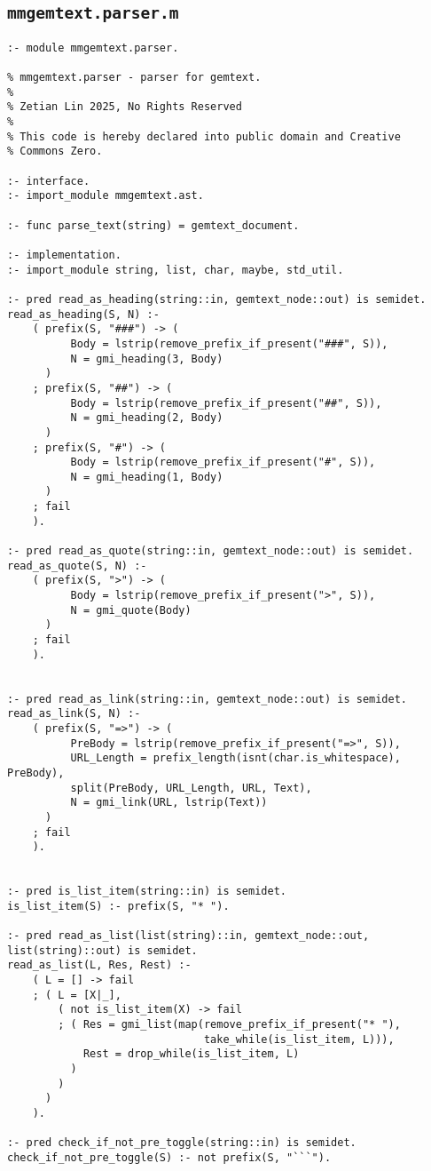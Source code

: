\subsection{\texttt{mmgemtext.parser.m}}

\begin{lstlisting}[language=Mercury]
:- module mmgemtext.parser.

% mmgemtext.parser - parser for gemtext.
%
% Zetian Lin 2025, No Rights Reserved
%
% This code is hereby declared into public domain and Creative
% Commons Zero.

:- interface.
:- import_module mmgemtext.ast.

:- func parse_text(string) = gemtext_document.

:- implementation.
:- import_module string, list, char, maybe, std_util.

:- pred read_as_heading(string::in, gemtext_node::out) is semidet.
read_as_heading(S, N) :-
	( prefix(S, "###") -> (
		  Body = lstrip(remove_prefix_if_present("###", S)),
		  N = gmi_heading(3, Body)
	  )
	; prefix(S, "##") -> (
		  Body = lstrip(remove_prefix_if_present("##", S)),
		  N = gmi_heading(2, Body)
	  )
	; prefix(S, "#") -> (
		  Body = lstrip(remove_prefix_if_present("#", S)),
		  N = gmi_heading(1, Body)
	  )
	; fail
	).

:- pred read_as_quote(string::in, gemtext_node::out) is semidet.
read_as_quote(S, N) :-
	( prefix(S, ">") -> (
		  Body = lstrip(remove_prefix_if_present(">", S)),
		  N = gmi_quote(Body)
	  )
	; fail
	).


:- pred read_as_link(string::in, gemtext_node::out) is semidet.
read_as_link(S, N) :-
	( prefix(S, "=>") -> (
		  PreBody = lstrip(remove_prefix_if_present("=>", S)),
		  URL_Length = prefix_length(isnt(char.is_whitespace), PreBody),
		  split(PreBody, URL_Length, URL, Text),
		  N = gmi_link(URL, lstrip(Text))
	  )
	; fail
	).


:- pred is_list_item(string::in) is semidet.
is_list_item(S) :- prefix(S, "* ").

:- pred read_as_list(list(string)::in, gemtext_node::out, list(string)::out) is semidet.
read_as_list(L, Res, Rest) :-
	( L = [] -> fail
	; ( L = [X|_],
		( not is_list_item(X) -> fail
		; ( Res = gmi_list(map(remove_prefix_if_present("* "),
							   take_while(is_list_item, L))),
			Rest = drop_while(is_list_item, L)
		  )
		)
	  )
	).

:- pred check_if_not_pre_toggle(string::in) is semidet.
check_if_not_pre_toggle(S) :- not prefix(S, "```").


\end{lstlisting}
